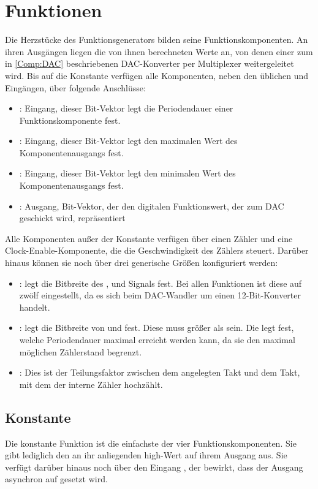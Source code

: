 \section{Funktionen}   \label{Comp:Func}
Die Herzstücke des Funktionsgenerators bilden seine Funktionskomponenten.
An ihren Ausgängen liegen die von ihnen berechneten Werte an, von denen einer zum in \cref{Comp:DAC} beschriebenen DAC-Konverter per Multiplexer weitergeleitet wird.
Bis auf die Konstante verfügen alle Komponenten, neben den üblichen  und  Eingängen, über folgende Anschlüsse:

\begin{itemize}
\item {}: Eingang, dieser Bit-Vektor legt die Periodendauer einer Funktionskomponente fest.
\item {}: Eingang, dieser Bit-Vektor legt den maximalen Wert des Komponentenausgangs fest.
\item {}: Eingang, dieser Bit-Vektor legt den minimalen Wert des Komponentenausgangs fest.
\item {}: Ausgang, Bit-Vektor, der den digitalen Funktionswert, der zum DAC geschickt wird, repräsentiert
\end{itemize}

Alle Komponenten außer der Konstante verfügen über einen Zähler und eine Clock-Enable-Komponente, die die Geschwindigkeit des Zählers steuert.
Darüber hinaus können sie noch über drei generische Größen konfiguriert werden:

\begin{itemize}
\item {}: legt die Bitbreite des ,  und  Signals fest.
Bei allen Funktionen ist diese auf zwölf eingestellt, da es sich beim DAC-Wandler um einen 12-Bit-Konverter handelt.
\item {}: legt die Bitbreite von  und  fest.
  Diese muss größer als  sein.
  Die  legt fest, welche Periodendauer maximal erreicht werden kann, da sie den maximal möglichen Zählerstand begrenzt.
\item {}: Dies ist der Teilungsfaktor zwischen dem angelegten Takt und dem Takt, mit dem der interne Zähler hochzählt.
\end{itemize}


\subsection{Konstante}   \label{Comp:Func:Const}
Die konstante Funktion ist die einfachste der vier Funktionskomponenten.
Sie gibt lediglich den an ihr anliegenden high-Wert auf ihrem Ausgang aus.
Sie verfügt darüber hinaus noch über den Eingang , der bewirkt, dass der Ausgang asynchron auf  gesetzt wird.

